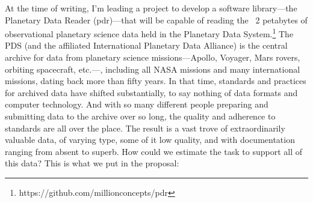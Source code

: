 \documentclass[12pt,oneside]{book}
\begin{document}
At the time of writing, I'm leading a project to develop a software library---the Planetary Data Reader (pdr)---that will be capable of reading the ~2 petabytes of observational planetary science data held in the Planetary Data System.\footnote{https://github.com/millionconcepts/pdr} The PDS (and the affiliated International Planetary Data Alliance) is the central archive for data from planetary science missions---Apollo, Voyager, Mars rovers, orbiting spacecraft, etc.---, including all NASA missions and many international missions, dating back more than fifty years. In that time, standards and practices for archived data have shifted substantially, to say nothing of data formats and computer technology. And with so many different people preparing and submitting data to the archive over so long, the quality and adherence to standards are all over the place. The result is a vast trove of extraordinarily valuable data, of varying type, some of it low quality, and with documentation ranging from absent to superb. How could we estimate the task to support all of this data? This is what we put in the proposal:
\end{document}
